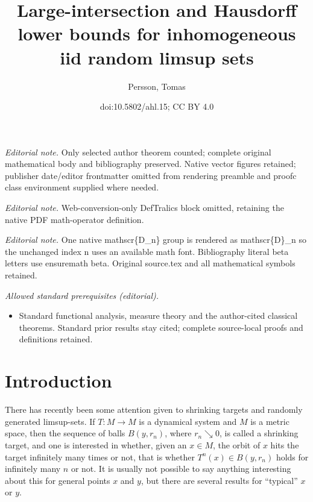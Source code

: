 \documentclass[10pt]{amsart}
\title{Large-intersection and Hausdorff lower bounds for inhomogeneous iid random limsup sets}
\author{Persson, Tomas}
\date{doi:10.5802/ahl.15; CC BY 4.0}
\theoremstyle{definition}\newtheorem{defi}[theo]{Definition}\newtheorem{rema}[theo]{Remark}\newtheorem{exam}[theo]{Example}\newtheorem{exem}[theo]{Example}\newtheorem{nota}[theo]{Notation}
\begin{document}
\maketitle
\noindent\textit{Editorial note.} Only selected author theorem counted; complete original mathematical body and bibliography preserved. Native vector figures retained; publisher date/editor frontmatter omitted from rendering preamble and proofc class environment supplied where needed.\par\medskip
\noindent\textit{Editorial note.} Web-conversion-only DefTralics block omitted, retaining the native PDF math-operator definition.\par\medskip
\noindent\textit{Editorial note.} One native mathscr\{D\_n\} group is rendered as mathscr\{D\}\_n so the unchanged index n uses an available math font. Bibliography literal beta letters use ensuremath beta. Original source.tex and all mathematical symbols retained.\par\medskip
\noindent\textit{Allowed standard prerequisites (editorial).}\begin{itemize}
\item Standard functional analysis, measure theory and the author-cited classical theorems. Standard prior results stay cited; complete source-local proofs and definitions retained.
\end{itemize}\medskip

\section{Introduction}

There has recently been some attention given to shrinking targets and randomly generated limsup-sets. If $T \colon M \to M$ is a dynamical system and $M$ is a metric space, then the sequence of balls $B(y,r_n)$, where $r_n \searrow 0$, is called a shrinking target, and one is interested in whether, given an $x \in M$, the orbit of $x$ hits the target infinitely many times or not, that is whether $T^n(x)
\in B(y,r_n)$ holds for infinitely many $n$ or not. It is usually not possible to say anything interesting about this for general points $x$ and $y$, but there are several results for ``typical'' $x$ or $y$.
\end{document}
